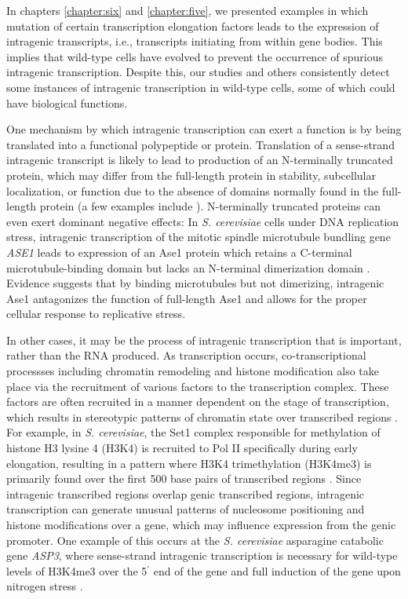 In chapters \ref{chapter:six} and \ref{chapter:five}, we presented examples in which mutation of certain transcription elongation factors leads to the expression of intragenic transcripts, i.e., transcripts initiating from within gene bodies.
This implies that wild-type cells have evolved to prevent the occurrence of spurious intragenic transcription.
Despite this, our studies and others \citep{cheung2008, doris2018, malabat2015, pelechano2013a} consistently detect some instances of intragenic transcription in wild-type cells, some of which could have biological functions.

One mechanism by which intragenic transcription can exert a function is by being translated into a functional polypeptide or protein.
Translation of a sense-strand intragenic transcript is likely to lead to production of an N-terminally truncated protein, which may differ from the full-length protein in stability, subcellular localization, or function due to the absence of domains normally found in the full-length protein (a few examples include \citet{carlson1982, benanti2009, gammie1999, mcknight2014}).
N-terminally truncated proteins can even exert dominant negative effects: In \textit{S. cerevisiae} cells under DNA replication stress, intragenic transcription of the mitotic spindle microtubule bundling gene \textit{ASE1} leads to expression of an Ase1 protein which retains a C-terminal microtubule-binding domain but lacks an N-terminal dimerization domain \citep{mcknight2014}.
Evidence suggests that by binding microtubules but not dimerizing, intragenic Ase1 antagonizes the function of full-length Ase1 and allows for the proper cellular response to replicative stress.

In other cases, it may be the process of intragenic transcription that is important, rather than the RNA produced.
As transcription occurs, co-transcriptional processses including chromatin remodeling and histone modification also take place via the recruitment of various factors to the transcription complex.
These factors are often recruited in a manner dependent on the stage of transcription, which results in stereotypic patterns of chromatin state over transcribed regions \citep{smolle2013, buratowski2010}.
For example, in \textit{S. cerevisiae}, the Set1 complex responsible for methylation of histone H3 lysine 4 (H3K4) is recruited to Pol II specifically during early elongation, resulting in a pattern where H3K4 trimethylation (H3K4me3) is primarily found over the first 500 base pairs of transcribed regions \citep{soares2017}.
Since intragenic transcribed regions overlap genic transcribed regions, intragenic transcription can generate unusual patterns of nucleosome positioning and histone modifications over a gene, which may influence expression from the genic promoter.
One example of this occurs at the \textit{S. cerevisiae} asparagine catabolic gene \textit{ASP3}, where sense-strand intragenic transcription is necessary for wild-type levels of H3K4me3 over the 5$^\prime$ end of the gene and full induction of the gene upon nitrogen stress \citep{huang2010}.

